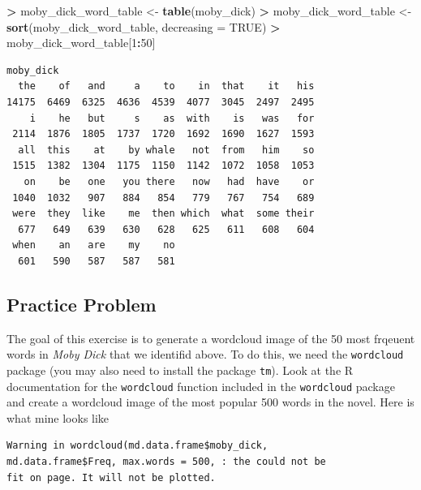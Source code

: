 \documentclass[
]{krantz}
\makeatletter
\newenvironment{Shaded}{\begin{snugshade}}{\end{snugshade}}
\newcommand{\DataTypeTok}[1]{\textcolor[rgb]{0.27,0.27,0.27}{#1}}
\newcommand{\DecValTok}[1]{\textcolor[rgb]{0.06,0.06,0.06}{#1}}
\newcommand{\KeywordTok}[1]{\textcolor[rgb]{0.27,0.27,0.27}{\textbf{#1}}}
\newcommand{\NormalTok}[1]{#1}
\newcommand{\OperatorTok}[1]{\textcolor[rgb]{0.43,0.43,0.43}{\textbf{#1}}}
\newcommand{\OtherTok}[1]{\textcolor[rgb]{0.37,0.37,0.37}{#1}}
\newcommand{\StringTok}[1]{\textcolor[rgb]{0.5,0.5,0.5}{#1}}
\newenvironment{kframe}{%
\medskip{}
\setlength{\fboxsep}{.8em}
 \def\at@end@of@kframe{}%
 \ifinner\ifhmode%
  \def\at@end@of@kframe{\end{minipage}}%
  \begin{minipage}{\columnwidth}%
 \fi\fi%
 \def\FrameCommand##1{\hskip\@totalleftmargin \hskip-\fboxsep
 \colorbox{shadecolor}{##1}\hskip-\fboxsep
     \hskip-\linewidth \hskip-\@totalleftmargin \hskip\columnwidth}%
 \MakeFramed {\advance\hsize-\width
   \@totalleftmargin\z@ \linewidth\hsize
   \@setminipage}}%
 {\par\unskip\endMakeFramed%
 \at@end@of@kframe}
\renewenvironment{Shaded}{\begin{kframe}}{\end{kframe}}
\makeatother
\begin{document}
\begin{Shaded}
\begin{Highlighting}[]
\OperatorTok{\textgreater{}}\StringTok{ }\NormalTok{moby\_dick\_word\_table \textless{}{-}}\StringTok{ }\KeywordTok{table}\NormalTok{(moby\_dick)}
\OperatorTok{\textgreater{}}\StringTok{ }\NormalTok{moby\_dick\_word\_table \textless{}{-}}\StringTok{ }\KeywordTok{sort}\NormalTok{(moby\_dick\_word\_table, }\DataTypeTok{decreasing =} \OtherTok{TRUE}\NormalTok{)}
\OperatorTok{\textgreater{}}\StringTok{ }\NormalTok{moby\_dick\_word\_table[}\DecValTok{1}\OperatorTok{:}\DecValTok{50}\NormalTok{]}
\end{Highlighting}
\end{Shaded}

\begin{verbatim}
moby_dick
  the    of   and     a    to    in  that    it   his 
14175  6469  6325  4636  4539  4077  3045  2497  2495 
    i    he   but     s    as  with    is   was   for 
 2114  1876  1805  1737  1720  1692  1690  1627  1593 
  all  this    at    by whale   not  from   him    so 
 1515  1382  1304  1175  1150  1142  1072  1058  1053 
   on    be   one   you there   now   had  have    or 
 1040  1032   907   884   854   779   767   754   689 
 were  they  like    me  then which  what  some their 
  677   649   639   630   628   625   611   608   604 
 when    an   are    my    no 
  601   590   587   587   581 
\end{verbatim}

\hypertarget{practice-problem-15}{%
\subsection{Practice Problem}\label{practice-problem-15}}

The goal of this exercise is to generate a wordcloud image of the 50 most frqeuent words in \emph{Moby Dick} that we identifid above. To do this, we need the \texttt{wordcloud} package (you may also need to install the package \texttt{tm}). Look at the R documentation for the \texttt{wordcloud} function included in the \texttt{wordcloud} package and create a wordcloud image of the most popular 500 words in the novel. Here is what mine looks like

\begin{verbatim}
Warning in wordcloud(md.data.frame$moby_dick,
md.data.frame$Freq, max.words = 500, : the could not be
fit on page. It will not be plotted.
\end{verbatim}
\end{document}
